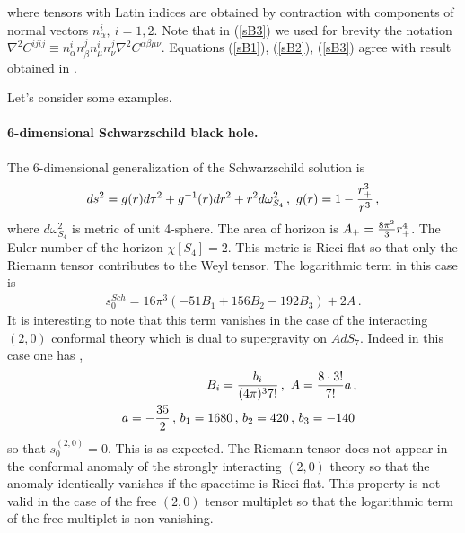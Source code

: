 \documentclass[12pt]{article}
\def\be{\begin{eqnarray}}
\def\ee{\end{eqnarray}}
\def\lb{\label}
\def\o{\over}
\begin{document}
where  tensors with  Latin indices  are obtained by contraction with components of normal vectors $n^i_\alpha, \ i=1,2$. Note that in (\ref{sB3}) we used for brevity the notation
$\nabla^2 C^{ijij}\equiv n^i_\alpha n^j_\beta n^i_\mu n^j_\nu \nabla^2 C^{\alpha\beta\mu\nu}$. Equations (\ref{sB1}), (\ref{sB2}), (\ref{sB3}) agree with result obtained in \cite{Hung:2011xb}.


\medskip

\noindent Let's consider some examples.

\medskip


\paragraph*{6-dimensional Schwarzschild black hole.} The 6-dimensional generalization of the Schwarzschild solution is \cite{Myers:1986un}
\be
ds^2=g(r)d\tau^2+g^{-1}(r)dr^2+r^2d\omega^2_{S_4}\, , \ g(r)=1-{r_+^3\o r^3}\, ,
\lb{d=6 Schrwazschild}
\ee
where $d\omega^2_{S_4}$ is metric of unit 4-sphere. The area of horizon is $A_+={8\pi^2\o 3}r_+^4$. The Euler number of the horizon $\chi[S_4]=2$. This metric is Ricci flat so that only the Riemann tensor contributes to the Weyl tensor. The logarithmic term in this case is
\be
s_0^{Sch}=16\pi^3(-51B_1+156 B_2-192B_3)+2A\, .
\lb{log term d=6 schwarzschild}
\ee
It is interesting to note that this term vanishes in the case of the  interacting $(2,0)$ conformal theory which is dual to supergravity on $AdS_7$. Indeed in  this case one has \cite{Henningson:1998gx},  \cite{Bastianelli:2000hi}
\be
&&B_i={b_i\o (4\pi)^3 7!}\, , \ A={8\cdot 3!\o 7!}a\, , \nonumber \\
&&a=-{35\o 2}\, , \, b_1=1680\, , \, b_2=420\, , \, b_3=-140\, 
\lb{2,0 theory}
\ee
so that $s^{(2,0)}_0=0$. This is as expected.  The Riemann tensor does not appear in the conformal anomaly of the strongly interacting $(2,0)$ theory so that the anomaly identically vanishes if the spacetime is Ricci flat. This property is not valid in the case of the free $(2,0)$ tensor multiplet \cite{Bastianelli:2000hi} so that the logarithmic term of the free multiplet is non-vanishing.
\end{document}
